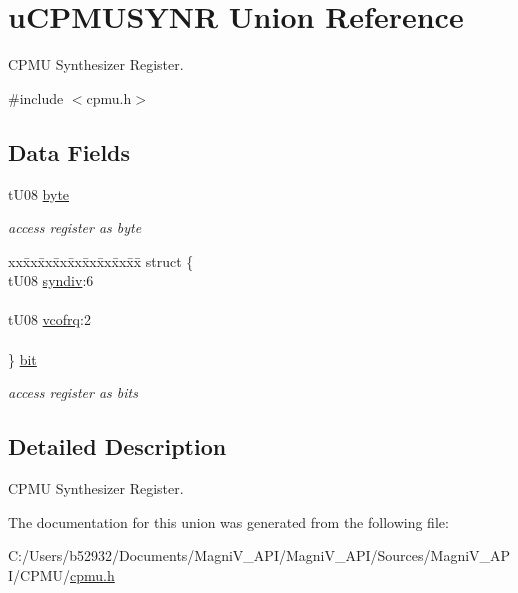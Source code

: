 \hypertarget{unionu_c_p_m_u_s_y_n_r}{}\section{u\+C\+P\+M\+U\+S\+Y\+N\+R Union Reference}
\label{unionu_c_p_m_u_s_y_n_r}


C\+P\+M\+U Synthesizer Register.  




{\ttfamily \#include $<$cpmu.\+h$>$}

\subsection*{Data Fields}
\begin{DoxyCompactItemize}
\item 
\hypertarget{unionu_c_p_m_u_s_y_n_r_aba308d63db050aed25cfd36c37e41ad4}{}t\+U08 \hyperlink{unionu_c_p_m_u_s_y_n_r_aba308d63db050aed25cfd36c37e41ad4}{byte}\label{unionu_c_p_m_u_s_y_n_r_aba308d63db050aed25cfd36c37e41ad4}

\begin{DoxyCompactList}\small\item\em access register as byte \end{DoxyCompactList}\item 
\hypertarget{unionu_c_p_m_u_s_y_n_r_a216f9bec7468b6d64868494b76159cfb}{}\begin{tabbing}
xx\=xx\=xx\=xx\=xx\=xx\=xx\=xx\=xx\=\kill
struct \{\\
\>tU08 \hyperlink{unionu_c_p_m_u_s_y_n_r_a777794ed839bba09eb52987f24f03452}{syndiv}:6\\
\>\\
\>tU08 \hyperlink{unionu_c_p_m_u_s_y_n_r_a74a93ec4b5949d6f7e881e51f13aa122}{vcofrq}:2\\
\>\\
\} \hyperlink{unionu_c_p_m_u_s_y_n_r_a216f9bec7468b6d64868494b76159cfb}{bit}\label{unionu_c_p_m_u_s_y_n_r_a216f9bec7468b6d64868494b76159cfb}
\\

\end{tabbing}\begin{DoxyCompactList}\small\item\em access register as bits \end{DoxyCompactList}\end{DoxyCompactItemize}


\subsection{Detailed Description}
C\+P\+M\+U Synthesizer Register. 

The documentation for this union was generated from the following file\+:\begin{DoxyCompactItemize}
\item 
C\+:/\+Users/b52932/\+Documents/\+Magni\+V\+\_\+\+A\+P\+I/\+Magni\+V\+\_\+\+A\+P\+I/\+Sources/\+Magni\+V\+\_\+\+A\+P\+I/\+C\+P\+M\+U/\hyperlink{cpmu_8h}{cpmu.\+h}\end{DoxyCompactItemize}
